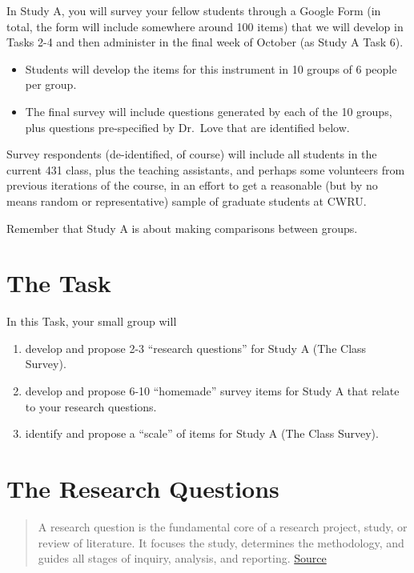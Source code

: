 \documentclass[]{book}
\providecommand{\tightlist}{%
  \setlength{\itemsep}{0pt}\setlength{\parskip}{0pt}}
\begin{document}
In Study A, you will survey your fellow students through a Google Form (in total, the form will include somewhere around 100 items) that we will develop in Tasks 2-4 and then administer in the final week of October (as Study A Task 6).

\begin{itemize}
\tightlist
\item
  Students will develop the items for this instrument in 10 groups of 6 people per group.
\item
  The final survey will include questions generated by each of the 10 groups, plus questions pre-specified by Dr.~Love that are identified below.
\end{itemize}

Survey respondents (de-identified, of course) will include all students in the current 431 class, plus the teaching assistants, and perhaps some volunteers from previous iterations of the course, in an effort to get a reasonable (but by no means random or representative) sample of graduate students at CWRU.

Remember that Study A is about making comparisons between groups.

\hypertarget{the-task}{%
\section{The Task}\label{the-task}}

In this Task, your small group will

\begin{enumerate}
\def\labelenumi{\arabic{enumi}.}
\tightlist
\item
  develop and propose 2-3 ``research questions'' for Study A (The Class Survey).
\item
  develop and propose 6-10 ``homemade'' survey items for Study A that relate to your research questions.
\item
  identify and propose a ``scale'' of items for Study A (The Class Survey).
\end{enumerate}

\hypertarget{the-research-questions}{%
\section{The Research Questions}\label{the-research-questions}}

\begin{quote}
A research question is the fundamental core of a research project, study, or review of literature. It focuses the study, determines the methodology, and guides all stages of inquiry, analysis, and reporting. \href{https://researchrundowns.com/intro/writing-research-questions/}{Source}
\end{quote}
\end{document}
